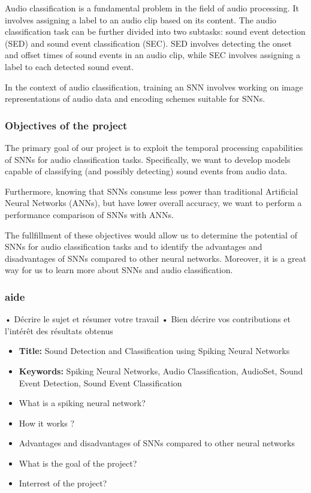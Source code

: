 \documentclass[11pt]{article}
\begin{document}
Audio classification is a fundamental problem in the field of audio processing. It involves assigning a label to an audio clip based on its content. The audio classification task can be further divided into two subtasks: sound event detection (SED) and sound event classification (SEC). SED involves detecting the onset and offset times of sound events in an audio clip, while SEC involves assigning a label to each detected sound event.

In the context of audio classification, training an SNN involves working on image representations of audio data and encoding schemes suitable for SNNs.


\subsubsection{Objectives of the project}

The primary goal of our project is to exploit the temporal processing capabilities of SNNs for audio classification tasks. Specifically, we want to develop models capable of classifying (and possibly detecting) sound events from audio data.

Furthermore, knowing that SNNs consume less power than traditional Artificial Neural Networks (ANNs), but have lower overall accuracy, we want to perform a performance comparison of SNNs with ANNs.

The fullfillment of these objectives would allow us to determine the potential of SNNs for audio classification tasks and to identify the advantages and disadvantages of SNNs compared to other neural networks. Moreover, it is a great way for us to learn more about SNNs and audio classification.

\subsubsection*{aide}
•	Décrire le sujet et résumer votre travail
•	Bien décrire vos contributions et l’intérêt des résultats obtenus


\begin{itemize}
  \item \textbf{Title:} Sound Detection and Classification using Spiking Neural Networks
  \item \textbf{Keywords:} Spiking Neural Networks, Audio Classification, AudioSet, Sound Event Detection, Sound Event Classification
  \item What is a spiking neural network?
  \item How it works ? 
  \item Advantages and disadvantages of SNNs compared to other neural networks
  \item What is the goal of the project?
  \item Interrest of the project?
\end{itemize}
\end{document}
